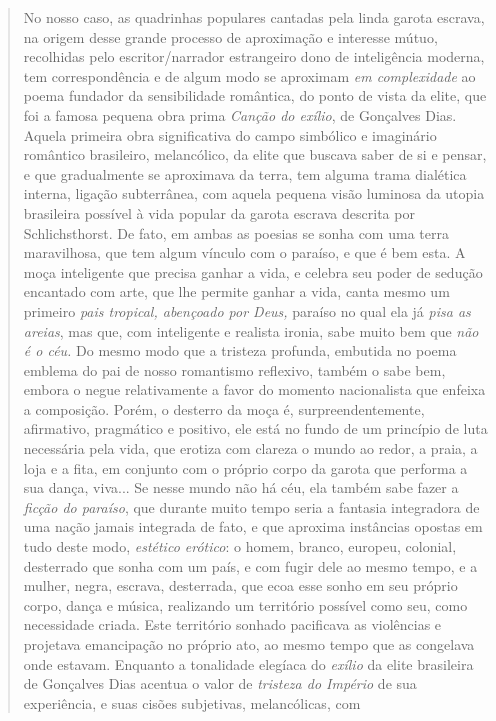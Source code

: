 \begin{quote}
No nosso caso, as quadrinhas populares cantadas pela linda garota
escrava, na origem desse grande processo de aproximação e interesse
mútuo, recolhidas pelo escritor/narrador estrangeiro dono de
inteligência moderna, tem correspondência e de algum modo se aproximam
\emph{em complexidade} ao poema fundador da sensibilidade romântica, do
ponto de vista da elite, que foi a famosa pequena obra prima
\emph{Canção do exílio}, de Gonçalves Dias. Aquela primeira obra
significativa do campo simbólico e imaginário romântico brasileiro,
melancólico, da elite que buscava saber de si e pensar, e que
gradualmente se aproximava da terra, tem alguma trama dialética interna,
ligação subterrânea, com aquela pequena visão luminosa da utopia
brasileira possível à vida popular da garota escrava descrita por
Schlichsthorst. De fato, em ambas as poesias se sonha com uma terra
maravilhosa, que tem algum vínculo com o paraíso, e que é bem esta. A
moça inteligente que precisa ganhar a vida, e celebra seu poder de
sedução encantado com arte, que lhe permite ganhar a vida, canta mesmo
um primeiro \emph{pais tropical, abençoado por Deus,} paraíso no qual
ela já \emph{pisa as areias}, mas que, com inteligente e realista
ironia, sabe muito bem que \emph{não é o céu.} Do mesmo modo que a
tristeza profunda, embutida no poema emblema do pai de nosso romantismo
reflexivo, também o sabe bem, embora o negue relativamente a favor do
momento nacionalista que enfeixa a composição. Porém, o desterro da moça
é, surpreendentemente, afirmativo, pragmático e positivo, ele está no
fundo de um princípio de luta necessária pela vida, que erotiza com
clareza o mundo ao redor, a praia, a loja e a fita, em conjunto com o
próprio corpo da garota que performa a sua dança, viva... Se nesse mundo
não há céu, ela também sabe fazer a \emph{ficção do paraíso}, que
durante muito tempo seria a fantasia integradora de uma nação jamais
integrada de fato, e que aproxima instâncias opostas em tudo deste modo,
\emph{estético erótico}: o homem, branco, europeu, colonial, desterrado
que sonha com um país, e com fugir dele ao mesmo tempo, e a mulher,
negra, escrava, desterrada, que ecoa esse sonho em seu próprio corpo,
dança e música, realizando um território possível como seu, como
necessidade criada. Este território sonhado pacificava as violências e
projetava emancipação no próprio ato, ao mesmo tempo que as congelava
onde estavam. Enquanto a tonalidade elegíaca do \emph{exílio} da elite
brasileira de Gonçalves Dias acentua o valor de \emph{tristeza do
Império} de sua experiência, e suas cisões subjetivas, melancólicas, com

\end{quote}
